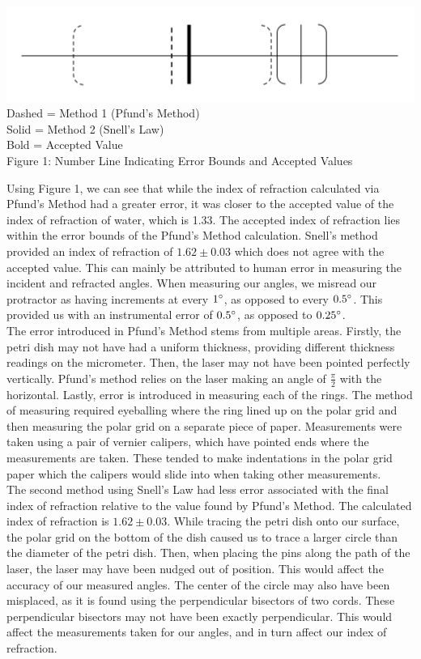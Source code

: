 \begin{center}
    \includegraphics[scale=0.5]{number line.png}\\
    Dashed = Method 1 (Pfund's Method)\\
    Solid = Method 2 (Snell's Law)\\
    Bold = Accepted Value \\
    Figure 1: Number Line Indicating Error Bounds and Accepted Values   
\end{center}
Using Figure 1, we can see that while the index of refraction calculated via Pfund's Method had a greater error, it was closer to the accepted value of the index of refraction of water, which is 1.33. The accepted index of refraction lies within the error bounds of the Pfund's Method calculation. Snell's method provided an index of refraction of $1.62\pm0.03$ which does not agree with the accepted value. This can mainly be attributed to human error in measuring the incident and refracted angles. When measuring our angles, we misread our protractor as having increments at every $1\degree$, as opposed to every $0.5\degree$. This provided us with an instrumental error of $0.5\degree$, as opposed to $0.25\degree$.
\\\indent The error introduced in Pfund's Method stems from multiple areas. Firstly, the petri dish may not have had a uniform thickness, providing different thickness readings on the micrometer. Then, the laser may not have been pointed perfectly vertically. Pfund's method relies on the laser making an angle of $\frac{\pi}{2}$ with the horizontal. Lastly, error is introduced in measuring each of the rings. The method of measuring required eyeballing where the ring lined up on the polar grid and then measuring the polar grid on a separate piece of paper. Measurements were taken using a pair of vernier calipers, which have pointed ends where the measurements are taken. These tended to make indentations in the polar grid paper which the calipers would slide into when taking other measurements.\\
\indent The second method using Snell's Law had less error associated with the final index of refraction relative to the value found by Pfund's Method. The calculated index of refraction is $1.62\pm0.03$. While tracing the petri dish onto our surface, the polar grid on the bottom of the dish caused us to trace a larger circle than the diameter of the petri dish. Then, when placing the pins along the path of the laser, the laser may have been nudged out of position. This would affect the accuracy of our measured angles. The center of the circle may also have been misplaced, as it is found using the perpendicular bisectors of two cords. These perpendicular bisectors may not have been exactly perpendicular. This would affect the measurements taken for our angles, and in turn affect our index of refraction.